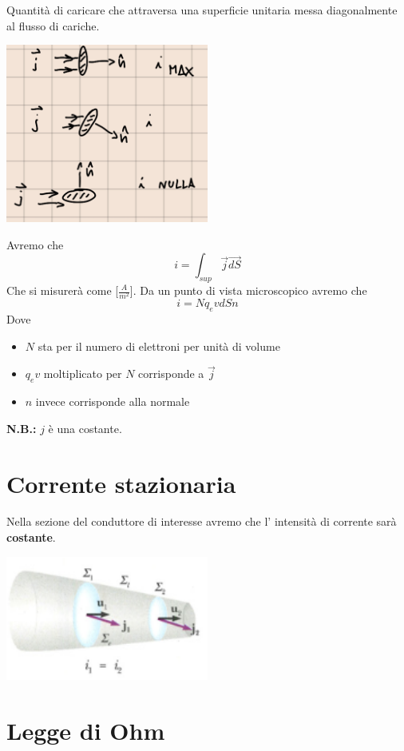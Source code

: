 \documentclass[a4paper, 12pt]{book}
\theoremstyle{plain}
\begin{document}
Quantità di caricare che attraversa una superficie
unitaria messa diagonalmente al flusso di cariche.
\begin{center}
    \includegraphics[width=0.5\textwidth]{dens_corr.png}
\end{center}
Avremo che 
\[
    i = \int_{sup} \vec{j} \vec{dS}
\]
Che si misurerà come [$\frac{A}{m^2}$]. Da un punto di 
vista microscopico avremo che 
\[
    i = Nq_evdSn
\]
Dove
\begin{itemize}
    \item $N$ sta per il numero di elettroni per unità di volume 
    \item $q_ev$ moltiplicato per $N$ corrisponde a $\vec{j}$
    \item $n$ invece corrisponde alla normale
\end{itemize}
\textbf{N.B.:} $j$ è una costante.

\section{Corrente stazionaria}

Nella sezione del conduttore di interesse avremo che l'
intensità di corrente sarà \textbf{costante}.
\begin{center}
    \includegraphics[width=0.5\textwidth]{corr_staz.png}
\end{center}

\section{Legge di Ohm}
\end{document}

